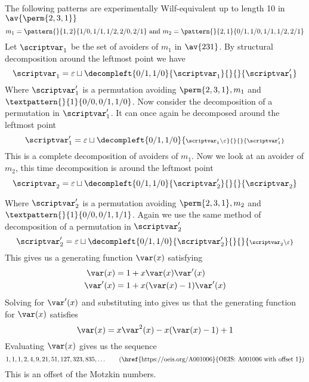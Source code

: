 \subsection{}
\nextvar
The following patterns are experimentally Wilf-equivalent up to length 10 in
\(\av{\perm{2,3,1}}\)
\begin{equation*}
    m_1 = \pattern{}{1,2}{1/0,1/1,1/2,2/0,2/1} \text{ and }
    m_2 = \pattern{}{2,1}{0/1,1/0,1/1,1/2,2/1}
\end{equation*}
Let \(\scriptvar_1\) be the set of avoiders of \(m_1\) in \(\av{231}\). By structural decomposition
around the leftmost point we have
\begin{equation*}
    \scriptvar_1 = \varepsilon \sqcup
    \decompleft{0/1,1/0}{\scriptvar_1}{}{}{\scriptvar^\prime_1}
\end{equation*}
Where \(\scriptvar^\prime_1\) is a permutation avoiding \(\perm{2,3,1}, m_1\)
and \(\textpattern{}{1}{0/0,0/1,1/0}\).
Now consider the decomposition of a permutation in \(\scriptvar^\prime_1\). It can
once again be decomposed around the leftmost point
\begin{equation*}
    \scriptvar^\prime_1 = \varepsilon \sqcup
    \decompleft{0/1,1/0}{\scriptstyle \scriptvar_1\setminus\varepsilon}{}{}{\scriptvar^\prime_1}
\end{equation*}
This is a complete decomposition of avoiders of \(m_1\). Now we
look at an avoider of \(m_2\), this time decomposition is around the leftmost point
\begin{equation*}
    \scriptvar_2 = \varepsilon \sqcup
    \decompleft{0/1,1/0}{\scriptvar^\prime_2}{}{}{\scriptvar_2}
\end{equation*}

Where \(\scriptvar^\prime_2\) is a permutation avoiding \(\perm{2,3,1}, m_2\)
and \(\textpattern{}{1}{0/0,0/1,1/1}\).
Again we use the same method of decomposition of a permutation in \(\scriptvar^\prime_2\)
\begin{equation*}
    \scriptvar^\prime_2 = \varepsilon \sqcup
    \decompleft{0/1,1/0}{\scriptvar^\prime_2}{}{}{\scriptstyle \scriptvar_2\setminus\varepsilon}
\end{equation*}
This gives us a generating function \(\var(x)\) satisfying
\begin{align}
    \var(x) &= 1 + x\var(x)\var^\prime(x) \label{eqn:Pgen}\\
    \var^\prime(x) &= 1 + x(\var(x)-1)\var^\prime(x)\label{eqn:PprimeGen}
\end{align}
Solving  for \(\var^\prime(x)\) and substituting into
 gives us that the generating function for
\(\var(x)\) satisfies
\begin{equation}
    \var(x) = x\var^2(x) - x(\var(x) - 1) + 1
\end{equation}
Evaluating \(\var(x)\) gives us the sequence
\begin{equation*}
    1, 1, 1, 2, 4, 9, 21, 51, 127, 323, 835,\dotsc \tag{\href{https://oeis.org/A001006}{OEIS: A001006 with offset 1}}
\end{equation*}
This is an offset of the Motzkin numbers.

